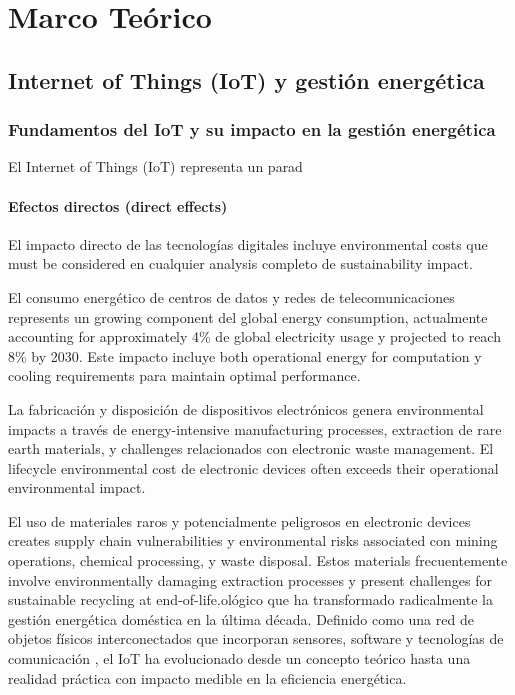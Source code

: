 \chapter{Marco Teórico}
\label{ch:marco_teorico}

\section{Internet of Things (IoT) y gestión energética}

\subsection{Fundamentos del IoT y su impacto en la gestión energética}

El Internet of Things (IoT) representa un parad\subsubsection{Efectos directos (direct effects)}

El impacto directo de las tecnologías digitales incluye environmental costs que must be considered en cualquier analysis completo de sustainability impact.

El consumo energético de centros de datos y redes de telecomunicaciones represents un growing component del global energy consumption, actualmente accounting for approximately 4\% de global electricity usage y projected to reach 8\% by 2030. Este impacto incluye both operational energy for computation y cooling requirements para maintain optimal performance.

La fabricación y disposición de dispositivos electrónicos genera environmental impacts a través de energy-intensive manufacturing processes, extraction de rare earth materials, y challenges relacionados con electronic waste management. El lifecycle environmental cost de electronic devices often exceeds their operational environmental impact.

El uso de materiales raros y potencialmente peligrosos en electronic devices creates supply chain vulnerabilities y environmental risks associated con mining operations, chemical processing, y waste disposal. Estos materials frecuentemente involve environmentally damaging extraction processes y present challenges for sustainable recycling at end-of-life.ológico que ha transformado radicalmente la gestión energética doméstica en la última década. Definido como una red de objetos físicos interconectados que incorporan sensores, software y tecnologías de comunicación \cite{atzori2010internet}, el IoT ha evolucionado desde un concepto teórico hasta una realidad práctica con impacto medible en la eficiencia energética.


